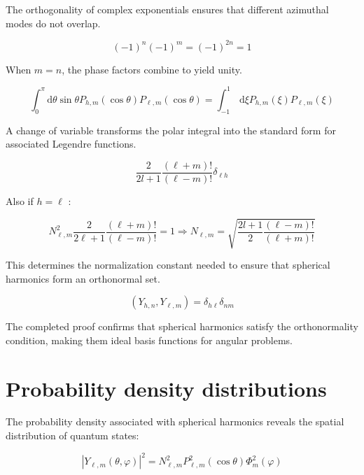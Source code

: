 The orthogonality of complex exponentials ensures that different azimuthal modes do not overlap.

\begin{equation}
(-1)^{n}(-1)^{m}=(-1)^{2 n}=1
\end{equation}

When $m=n$, the phase factors combine to yield unity.

\begin{equation}
\int_{0}^{\pi} \mathrm{d} \theta \sin \theta P_{h, m}(\cos \theta) P_{\ell, m}(\cos \theta)=\int_{-1}^{1} \, \mathrm{d} \xi P_{h, m}(\xi) P_{\ell, m}(\xi)
\end{equation}

A change of variable transforms the polar integral into the standard form for associated Legendre functions.

\begin{equation}
\frac{2}{2 l+1} \frac{(\ell+m)!}{(\ell-m)!} \delta_{\ell h}
\end{equation}

Also if $h=\ell$ :

\begin{equation}
N_{\ell, m}^{2} \frac{2}{2 \ell+1} \frac{(\ell+m)!}{(\ell-m)!}=1 \Longrightarrow N_{\ell, m}=\sqrt{\frac{2 l+1}{2} \frac{(\ell-m)!}{(\ell+m)!}}
\end{equation}

This determines the normalization constant needed to ensure that spherical harmonics form an orthonormal set.

\begin{equation}
\left(Y_{h, n}, Y_{\ell, m}\right)=\delta_{h \ell} \delta_{n m}
\end{equation}

The completed proof confirms that spherical harmonics satisfy the orthonormality condition, making them ideal basis functions for angular problems.

\section{Probability density distributions}
The probability density associated with spherical harmonics reveals the spatial distribution of quantum states:

\begin{equation}
\left|Y_{\ell, m}(\theta, \varphi)\right|^{2}=N_{\ell, m}^{2} P_{\ell, m}^{2}(\cos \theta) \Phi_{m}^{2}(\varphi)
\end{equation}

